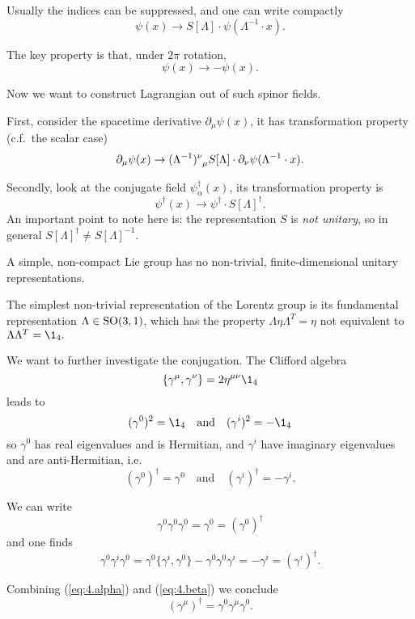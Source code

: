 \documentclass[a4paper,11pt]{article}
\begin{document}
	Usually the indices can be suppressed, and one can write compactly
		\[
			\psi(x) \to S[\Lambda] \cdot \psi(\Lambda^{-1} \cdot x).
		\]

	The key property is that, under $2 \pi$ rotation, 
	\[
		\psi(x) \to - \psi(x).
	\]
	
	Now we want to construct Lagrangian out of such spinor fields. 

	First, consider the spacetime derivative $\partial_\mu \psi(x)$, it has transformation property (c.f.\ the scalar case)
	\[
		\partial_\mu \psi(x) \to (\Lambda^{-1})\indices{^\nu_\mu} S[\Lambda]\cdot \partial_\nu \psi(\Lambda^{-1} \cdot x).
	\]
	 
	Secondly, look at the conjugate field $\psi^{\dagger}_\alpha(x)$, its transformation property is
	\begin{equation}
		\psi^{\dagger}(x) \to \psi^{\dagger} \cdot S[\Lambda]^{\dagger}.
		\label{eq:4.3.2}
	\end{equation}
	An important point to note here is: the representation $S$ is \emph{not unitary}, so in general $S[\Lambda]^{\dagger} \neq S[\Lambda]^{-1}$. 

	\begin{thm}
		A simple, non-compact Lie group has no non-trivial, finite-dimensional unitary representations.
	\end{thm}

	The simplest non-trivial representation of the Lorentz group is its fundamental representation $\Lambda \in \operatorname{SO}(3,1)$, which has the property $\Lambda \eta \Lambda^T = \eta$ not equivalent to $\Lambda \Lambda^T = \1_4.$
	
	We want to further investigate the conjugation. The Clifford algebra
	\[
		\{\gamma^\mu, \gamma^\nu\} = 2 \eta ^{\mu \nu} \1_4
	\]
	leads to 
	\[
		(\gamma^0)^2 = \1_4 \quad \text{and} \quad (\gamma^i)^2 = - \1_4
	\]
	so $\gamma^0$ has real eigenvalues and is Hermitian, and $\gamma^i$ have imaginary eigenvalues and are anti-Hermitian, i.e.\ 
	\[
		(\gamma^0)^{\dagger} = \gamma^0 \quad \text{and} \quad (\gamma^i)^{\dagger} = - \gamma^i.
	\]
	
	We can write
	\[
		\gamma^0 \gamma^0 \gamma^0 = \gamma^0 = (\gamma^0)^{\dagger}
		\tag{$\alpha$}
		\label{eq:4.alpha}
	\]
	and one finds
	\[
		\gamma^0 \gamma^i \gamma^0 = \gamma^0 \{\gamma^i, \gamma^0\} - \gamma^0 \gamma^0 \gamma^i = - \gamma^i = (\gamma^i)^{\dagger}.
		\tag{$\beta$}
		\label{eq:4.beta}
	\]
	
	Combining (\ref{eq:4.alpha}) and (\ref{eq:4.beta}) we conclude 
	\[
		(\gamma^\mu)^{\dagger} = \gamma^0 \gamma^\mu \gamma^0.
	\]
	
	
	
	
	  
\end{document}
